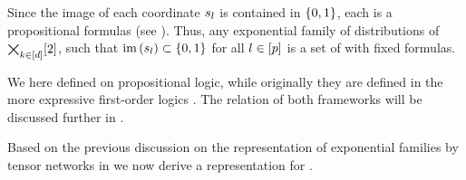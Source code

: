 Since the image of each coordinate $s_{l}$ is contained in $\{0,1\}$, each is a propositional formulas (see ).
Thus, any exponential family of distributions of $\bigtimes_{k\in[d]}[2]$, such that $\mathrm{im}\left(s_{l}\right)\subset\{0,1\}$ for all $l\in[p]$ is a set of \MarkovLogicNetworks{} with fixed formulas.

\begin{remark}
    We here defined \MarkovLogicNetworks{} on propositional logic, while originally they are defined in the more expressive first-order logics \cite{richardson_markov_2006}.
    The relation of both frameworks will be discussed further in .
\end{remark}




Based on the previous discussion on the representation of exponential families by tensor networks in  we now derive a representation for \MarkovLogicNetworks{}.


